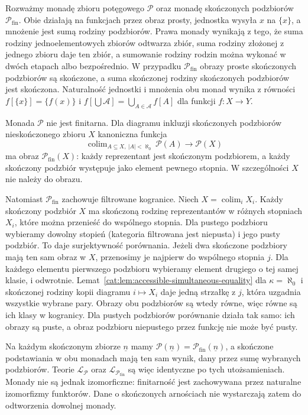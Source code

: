 \begin{przyklad}\label{cat:ex:lawvere-nonfinitary-powerset}
Rozważmy monadę zbioru potęgowego $\mathcal P$ oraz monadę skończonych podzbiorów $\mathcal P_{\mathrm{fin}}$. Obie działają na funkcjach przez obraz prosty, jednostka wysyła $x$ na $\{x\}$, a mnożenie jest sumą rodziny podzbiorów. Prawa monady wynikają z tego, że suma rodziny jednoelementowych zbiorów odtwarza zbiór, suma rodziny złożonej z jednego zbioru daje ten zbiór, a sumowanie rodziny rodzin można wykonać w dwóch etapach albo bezpośrednio. W przypadku $\mathcal P_{\mathrm{fin}}$ obrazy proste skończonych podzbiorów są skończone, a suma skończonej rodziny skończonych podzbiorów jest skończona. Naturalność jednostki i mnożenia obu monad wynika z równości $f[\{x\}]=\{f(x)\}$ i $f[\bigcup\mathcal A]=\bigcup_{A\in\mathcal A}f[A]$ dla funkcji $f:X\to Y$.

Monada $\mathcal P$ nie jest finitarna. Dla diagramu inkluzji skończonych podzbiorów nieskończonego zbioru $X$ kanoniczna funkcja
\[
 \operatorname{colim}_{A\subseteq X,\ |A|<\aleph_0}\mathcal P(A)
 \longrightarrow\mathcal P(X)
\]
ma obraz $\mathcal P_{\mathrm{fin}}(X)$: każdy reprezentant jest skończonym podzbiorem, a każdy skończony podzbiór występuje jako element pewnego stopnia. W szczególności $X$ nie należy do obrazu.

Natomiast $\mathcal P_{\mathrm{fin}}$ zachowuje filtrowane kogranice. Niech $X=\operatorname{colim}_i X_i$. Każdy skończony podzbiór $X$ ma skończoną rodzinę reprezentantów w różnych stopniach $X_i$, które można przenieść do wspólnego stopnia. Dla pustego podzbioru wybieramy dowolny stopień (kategoria filtrowana jest niepusta) i jego pusty podzbiór. To daje surjektywność porównania. Jeżeli dwa skończone podzbiory mają ten sam obraz w $X$, przenosimy je najpierw do wspólnego stopnia $j$. Dla każdego elementu pierwszego podzbioru wybieramy element drugiego o tej samej klasie, i odwrotnie. Lemat~\ref{cat:lem:accessible-simultaneous-equality} dla $\kappa=\aleph_0$ i skończonej rodziny kopii diagramu $i\mapsto X_i$ daje jedną strzałkę z $j$, która uzgadnia wszystkie wybrane pary. Obrazy obu podzbiorów są wtedy równe, więc równe są ich klasy w kogranicy. Dla pustych podzbiorów porównanie działa tak samo: ich obrazy są puste, a obraz podzbioru niepustego przez funkcję nie może być pusty.

Na każdym skończonym zbiorze $\underline n$ mamy $\mathcal P(\underline n)=\mathcal P_{\mathrm{fin}}(\underline n)$, a skończone podstawiania w obu monadach mają ten sam wynik, dany przez sumę wybranych podzbiorów. Teorie $\mathcal L_{\mathcal P}$ oraz $\mathcal L_{\mathcal P_{\mathrm{fin}}}$ są więc identyczne po tych utożsamieniach. Monady nie są jednak izomorficzne: finitarność jest zachowywana przez naturalne izomorfizmy funktorów. Dane o skończonych arnościach nie wystarczają zatem do odtworzenia dowolnej monady.
\end{przyklad}

